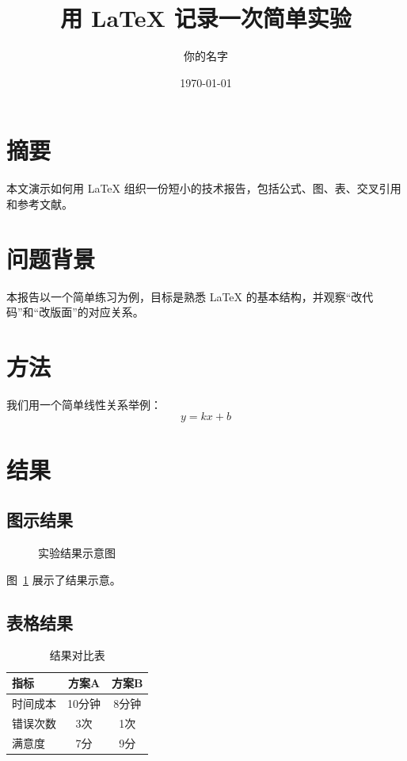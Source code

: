 \documentclass[12pt,a4paper]{ctexart} %
\title{用 LaTeX 记录一次简单实验} %
\author{你的名字} %
\date{\today} %
\begin{document}
\maketitle %
\tableofcontents %

\section{摘要} %
本文演示如何用 LaTeX 组织一份短小的技术报告，包括公式、图、表、交叉引用和参考文献。

\section{问题背景} %
本报告以一个简单练习为例，目标是熟悉 LaTeX 的基本结构，并观察“改代码”和“改版面”的对应关系。

\section{方法} %
我们用一个简单线性关系举例：
\begin{equation}
  y = kx + b %
\end{equation}

\section{结果} %

\subsection{图示结果}
\begin{figure}[htbp]
  \centering

  \fbox{\rule{0pt}{4cm}\rule{0.7\linewidth}{0pt}}


  \caption{实验结果示意图} %
  \label{fig:result} %
\end{figure}

图~\ref{fig:result} 展示了结果示意。 %

\subsection{表格结果}
\begin{table}[htbp]
  \centering
  \begin{tabular}{lcc}
    \hline
    指标 & 方案A & 方案B \\
    \hline
    时间成本 & 10分钟 & 8分钟 \\
    错误次数 & 3次 & 1次 \\
    满意度 & 7分 & 9分 \\
    \hline
  \end{tabular}
  \caption{结果对比表} %
  \label{tab:result} %
\end{table}
\end{document}
